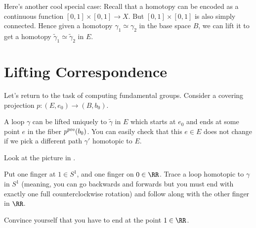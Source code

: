 \begin{remark}
	Here's another cool special case:
	Recall that a homotopy can be encoded as a continuous function $[0,1] \times [0,1] \to X$.
	But $[0,1] \times [0,1]$ is also simply connected.
	Hence given a homotopy $\gamma_1 \simeq \gamma_2$ in the base space $B$, we can lift it to get
 a homotopy $\tilde\gamma_1 \simeq \tilde\gamma_2$ in $E$.
\end{remark}

\section{Lifting Correspondence}
Let's return to the task of computing fundamental groups.
Consider a covering projection $p : (E, e_0) \to (B, b_0)$.

A loop $\gamma$ can be lifted uniquely to $\tilde\gamma$ in $E$
which starts at $e_0$ and ends at some point $e$ in the fiber $p^{\text{pre}}(b_0)$.
You can easily check that this $e \in E$ does not change if we
pick a different path $\gamma'$ homotopic to $E$.
\begin{ques}
	Look at the picture in .

	Put one finger at $1 \in S^1$, and one finger on $0 \in \RR$.
	Trace a loop homotopic to $\gamma$ in $S^1$ (meaning, you can
	go backwards and forwards but you must end with exactly one full
	counterclockwise rotation)
	and follow along with the other finger in $\RR$.

	Convince yourself that you have to end at the point $1 \in \RR$.
\end{ques}

